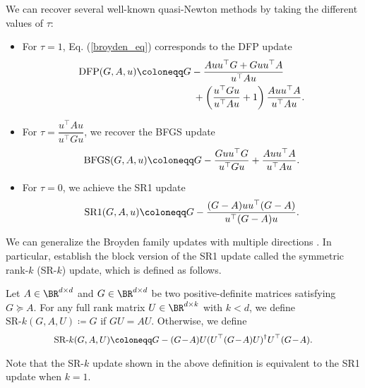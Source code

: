 We can recover several well-known quasi-Newton methods by taking the different values of $\tau$:
\begin{itemize}
\item  For $\tau = 1$, Eq. (\ref{broyden_eq}) corresponds to the DFP update
\begin{equation*}
\begin{split}
    {\rm DFP}(G, A, u) \coloneqq & G - \frac{A u u^{\top} G + G u u^{\top} A}{u^{\top} A u}  \\
    & \quad + \left( \frac{u^{\top} G u}{u^{\top} A u} + 1 \right) \frac{A u u^{\top} A}{u^{\top} A u}.
\end{split}
\end{equation*}
\item For $\tau = \dfrac{u^{\top} A u}{u^{\top} G u}$, we recover the BFGS update
\begin{equation*}
    {\rm BFGS}(G, A, u) \coloneqq G - \frac{G u u^{\top} G}{u^{\top} G u} + \frac{A u u^{\top} A}{u^{\top} A u}.
\end{equation*}
\item For $\tau=0$, we achieve the SR1 update
\begin{equation}
    {\rm SR1}(G, A, u) \coloneqq G - \frac{(G - A) u u^{\top} (G - A)}{u^{\top} (G - A) u}.
    \label{sr1_def}
\end{equation}
\end{itemize}

We can generalize the Broyden family updates with multiple directions \cite{gao2018block,liu2023symmetric,gower2016stochastic,gower2017randomized}. 
In particular, \citet{liu2023symmetric} establish the block version of the SR1 update called the symmetric rank-$k$ (SR-$k$) update, which is defined as follows.

\begin{definition}\label{dfn:srk}
Let $A \in \BR^{d \times d}$ and $G \in \BR^{d \times d}$ be two positive-definite matrices satisfying $G \succeq A$. 
For any full rank matrix $U\in\BR^{d\times k}$ with $k < d$, we define $\textrm{SR-}k (G, A, U)  \coloneqq G$ if $G U = A U$. Otherwise, we define
\begin{equation*}
\small\begin{split}
        \textrm{SR-}k (G, A, U)\coloneqq G - (G\!-\!A) U (U^{\top} (G\!-\!A) U)^{\dag} U^{\top} (G\!-\!A).
\end{split}
\end{equation*}

\begin{remark}    
Note that the SR-$k$ update shown in the above definition is equivalent to the SR1 update when $k=1$.
\end{remark}
\end{definition}

